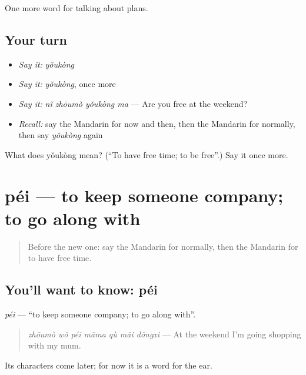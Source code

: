 \begin{grammarlens}[title={What you've built}]
One more word for talking about plans.
\end{grammarlens}

\subsection*{Your turn}
\begin{itemize}
\raggedright
  \item \emph{Say it:} \emph{yǒukòng}
  \item \emph{Say it:} \emph{yǒukòng}, once more
  \item \emph{Say it:} \emph{nǐ zhōumò yǒukòng ma} — Are you free at the weekend?
  \item \emph{Recall:} say the Mandarin for now and then, then the Mandarin for normally, then say \emph{yǒukòng} again
\end{itemize}

\begin{tcolorbox}[breakable,colback=teal!4,colframe=teal!35!black,title={Before you move on}]
What does yǒukòng mean? (\textquotedblleft{}To have free time; to be free\textquotedblright{}.) Say it once more.
\end{tcolorbox}
\section[péi]{péi — to keep someone company; to go along with}

\label{lesson:ZH-C163-pei}



\begin{quote}
Before the new one: say the Mandarin for normally, then the Mandarin for to have free time.
\end{quote}

\subsection*{You'll want to know: péi}
\emph{péi} — \textquotedblleft{}to keep someone company; to go along with\textquotedblright{}.

\begin{quote}
\emph{zhōumò wǒ péi māma qù mǎi dōngxi} — At the weekend I'm going shopping with my mum.
\end{quote}

Its characters come later; for now it is a word for the ear.

